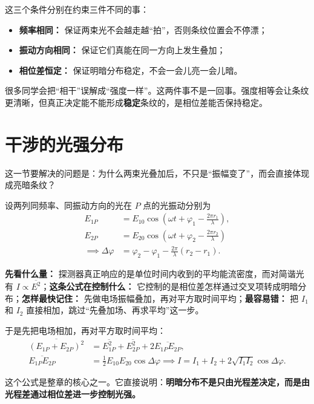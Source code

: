 \documentclass[lang=cn,11pt]{elegantbook}
\begin{document}
这三个条件分别在约束三件不同的事：
\begin{itemize}
  \item \textbf{频率相同：} 保证两束光不会越走越“拍”，否则条纹位置会不停漂；
  \item \textbf{振动方向相同：} 保证它们真能在同一方向上发生叠加；
  \item \textbf{相位差恒定：} 保证明暗分布稳定，不会一会儿亮一会儿暗。
\end{itemize}

\begin{remark}
很多同学会把“相干”误解成“强度一样”。这两件事不是一回事。强度相等会让条纹更清晰，但真正决定能不能形成\textbf{稳定}条纹的，是相位差能否保持稳定。
\end{remark}

\section{干涉的光强分布}

这一节要解决的问题是：为什么两束光叠加后，不只是“振幅变了”，而会直接体现成亮暗条纹？

设两列同频率、同振动方向的光在 \(P\) 点的光振动分别为
\[
\begin{aligned}
E_{1P}&=E_{10}\cos\left(\omega t+\varphi_1-\frac{2\pi r_1}{\lambda}\right),\\
E_{2P}&=E_{20}\cos\left(\omega t+\varphi_2-\frac{2\pi r_2}{\lambda}\right)\\
\implies \Delta\varphi&=\varphi_2-\varphi_1-\frac{2\pi}{\lambda}(r_2-r_1).
\end{aligned}
\]

\begin{note}
\textbf{先看什么量：} 探测器真正响应的是单位时间内收到的平均能流密度，而对简谐光有 \(I\propto \overline{E^2}\)；\textbf{这条公式在控制什么：} 它控制的是相位差怎样通过交叉项转成明暗分布；\textbf{怎样最快记住：} 先做电场振幅叠加，再对平方取时间平均；\textbf{最容易错：} 把 \(I_1\) 和 \(I_2\) 直接相加，跳过“先叠加场、再求平均”这一步。
\end{note}
于是先把电场相加，再对平方取时间平均：
\[
\begin{aligned}
\overline{(E_{1P}+E_{2P})^2}
&=\overline{E_{1P}^2}+\overline{E_{2P}^2}+2\overline{E_{1P}E_{2P}},\\
\overline{E_{1P}E_{2P}}
&=\frac{1}{2}E_{10}E_{20}\cos\Delta\varphi
\implies
I=I_1+I_2+2\sqrt{I_1I_2}\cos\Delta\varphi.
\end{aligned}
\]

这个公式是整章的核心之一。它直接说明：\textbf{明暗分布不是只由光程差决定，而是由光程差通过相位差进一步控制光强。}
\end{document}
